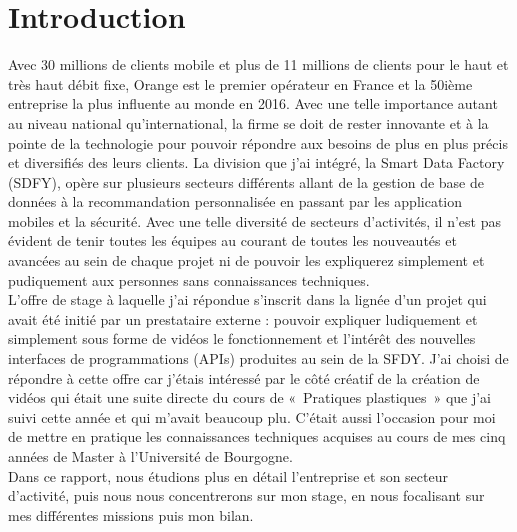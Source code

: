 \chapter*{Introduction}
\label{chap:introduction}

Avec 30 millions de clients mobile et plus de 11 millions de clients  pour le haut et très haut débit fixe, Orange est le premier opérateur en France et la 50ième entreprise la plus influente au monde en 2016. Avec une telle importance autant au niveau national qu'international, la firme se doit de rester innovante et à la pointe de la technologie pour pouvoir répondre aux besoins de plus en plus précis et diversifiés des leurs clients. La division que j’ai intégré, la Smart Data Factory (SDFY), opère sur plusieurs secteurs différents allant de la gestion de base de données à la recommandation personnalisée en passant par les application mobiles et la sécurité. Avec une telle diversité de secteurs d’activités, il n’est pas évident de tenir toutes les équipes au courant de toutes les nouveautés et avancées au sein de chaque projet ni de pouvoir les expliquerez simplement et pudiquement aux personnes sans connaissances techniques.\\
L’offre de stage à laquelle j’ai répondue s’inscrit dans la lignée d’un projet qui avait été initié par un prestataire externe : pouvoir expliquer ludiquement et simplement sous forme de vidéos le fonctionnement et l’intérêt des nouvelles  interfaces de programmations (APIs) produites au sein de la SFDY. J’ai choisi de répondre à cette offre car j’étais intéressé par le côté créatif de la création de vidéos qui était une suite directe du cours de « Pratiques plastiques » que j’ai suivi cette année et qui m’avait beaucoup plu. C’était aussi l’occasion pour moi de mettre en pratique les connaissances techniques acquises au cours de mes cinq années de Master à l’Université de Bourgogne.\\
Dans ce rapport, nous étudions plus en détail l’entreprise et son secteur d’activité, puis nous nous concentrerons sur mon stage, en nous focalisant sur mes différentes missions puis mon bilan.
